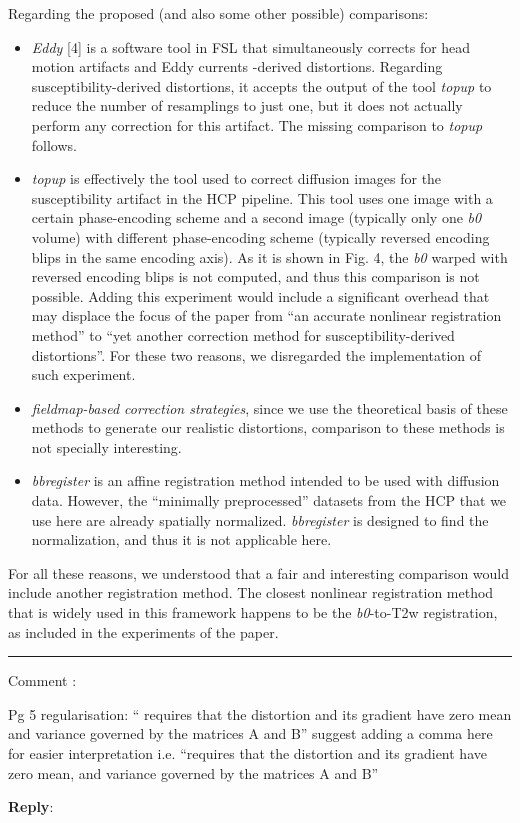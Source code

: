 \documentclass[9pt]{memoir}
\newcounter{reviewpoint}
\newenvironment{reviewpoint}%
{\refstepcounter{reviewpoint}\par\medskip\vspace{3ex}\hrule\vspace{1.5ex}\par\noindent%
   {\fontseries{b}\selectfont Comment \arabic{reviewpoint}:}
   \begingroup%
   \color{black!60}
   \fontshape{it}\selectfont %

}
{\endgroup\label{com:\thereviewpoint}\par\medskip}
\newcommand{\reply}{\par\fontshape{n}\selectfont \noindent \textbf{Reply}:\ }
\begin{document}
{Regarding the proposed (and also some other possible) comparisons:
\begin{itemize}
\item \emph{Eddy} [4] is a software tool in FSL that simultaneously corrects for
    head motion artifacts and Eddy currents -derived distortions.
  Regarding susceptibility-derived distortions, it accepts the output of the tool 
    \emph{topup} to reduce the number of resamplings to just one, but it does not
    actually perform any correction for this artifact.
  The missing comparison to \emph{topup} follows.
\item \emph{topup} is effectively the tool used to correct diffusion images for the
  susceptibility artifact in the HCP pipeline.
  This tool uses one image with a certain phase-encoding scheme and a second image
    (typically only one \emph{b0} volume) with different phase-encoding scheme (typically
    reversed encoding blips in the same encoding axis).
  As it is shown in Fig. 4, the \emph{b0} warped with reversed encoding blips is not
    computed, and thus this comparison is not possible.
  Adding this experiment would include a significant overhead that may displace the focus
    of the paper from ``an accurate nonlinear registration method'' to ``yet another 
    correction method for susceptibility-derived distortions''.
  For these two reasons, we disregarded the implementation of such experiment.
\item \emph{fieldmap-based correction strategies}, since we use the theoretical basis of these
  methods to generate our realistic distortions, comparison to these methods is not specially
  interesting.
\item \emph{bbregister} is an affine registration method intended to be used with diffusion
  data.
  However, the ``minimally preprocessed'' datasets from the HCP that we use here are already
  spatially normalized.
  \emph{bbregister} is designed to find the normalization, and thus it is not applicable
  here.
\end{itemize}
For all these reasons, we understood that a fair and interesting comparison would include
  another registration method.
The closest nonlinear registration method that is widely used in this framework happens
  to be the \emph{b0}-to-T2w registration, as included in the experiments of the paper.
}

\begin{reviewpoint}
Pg 5 regularisation: `` requires that the distortion and its gradient have zero mean and variance governed by the matrices A and B'' suggest adding a comma here for easier interpretation i.e. ``requires that the distortion and its gradient have zero mean, and variance governed by the matrices A and B''
\end{reviewpoint}
\reply{%
}
\end{document}
